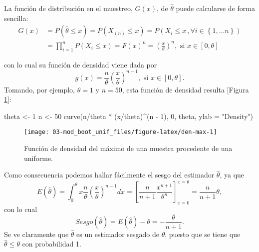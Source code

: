 \documentclass[
]{book}
\newenvironment{Shaded}{\begin{snugshade}}{\end{snugshade}}
\newcommand{\AttributeTok}[1]{\textcolor[rgb]{0.77,0.63,0.00}{#1}}
\newcommand{\DecValTok}[1]{\textcolor[rgb]{0.00,0.00,0.81}{#1}}
\newcommand{\FunctionTok}[1]{\textcolor[rgb]{0.00,0.00,0.00}{#1}}
\newcommand{\NormalTok}[1]{#1}
\newcommand{\OtherTok}[1]{\textcolor[rgb]{0.56,0.35,0.01}{#1}}
\newcommand{\SpecialCharTok}[1]{\textcolor[rgb]{0.00,0.00,0.00}{#1}}
\newcommand{\StringTok}[1]{\textcolor[rgb]{0.31,0.60,0.02}{#1}}
\theoremstyle{break}
\theoremstyle{definition}
\theoremstyle{definition}
\theoremstyle{definition}
\theoremstyle{definition}
\theoremstyle{remark}
\begin{document}
La función de distribución en el muestreo, \(G\left( x \right)\), de
\(\hat{\theta}\) puede calcularse de forma sencilla:\[\begin{aligned}
G\left( x \right) &= P\left( \hat{\theta}\leq x \right) =P\left( X_{\left(
n \right)}\leq x \right) =P\left( X_i\leq x\,,\forall i\in \left\{ 1,\ldots
n\right\} \right) \\
&= \prod_{i=1}^{n}P\left( X_i\leq x \right) =F\left( x \right)^{n}=\left( 
\frac{x}{\theta } \right)^{n},\text{ si }x\in \left[ 0,\theta \right]\end{aligned}\]

con lo cual su función de densidad viene dada por
\[g\left( x \right) =\frac{n}{\theta }\left( \frac{x}{\theta } \right)^{n-1},
\text{ si }x\in \left[ 0,\theta \right] .\]
Tomando, por ejemplo, \(\theta =1\) y \(n=50\), esta función de densidad resulta
{[}Figura \ref{fig:den-max}{]}:

\begin{Shaded}
\begin{Highlighting}[]
\NormalTok{theta }\OtherTok{\textless{}{-}} \DecValTok{1}
\NormalTok{n }\OtherTok{\textless{}{-}} \DecValTok{50}
\FunctionTok{curve}\NormalTok{(n}\SpecialCharTok{/}\NormalTok{theta }\SpecialCharTok{*}\NormalTok{ (x}\SpecialCharTok{/}\NormalTok{theta)}\SpecialCharTok{\^{}}\NormalTok{(n }\SpecialCharTok{{-}} \DecValTok{1}\NormalTok{), }\DecValTok{0}\NormalTok{, theta, }\AttributeTok{ylab =} \StringTok{"Density"}\NormalTok{)}
\end{Highlighting}
\end{Shaded}

\begin{figure}[!htb]

{\centering \texttt{[image: 03-mod\_boot\_unif\_files/figure-latex/den-max-1]} 

}

\caption{Función de densidad del máximo de una muestra procedente de una uniforme.}\label{fig:den-max}
\end{figure}

Como consecuencia podemos hallar fácilmente el sesgo del estimador
\(\hat{\theta}\), ya que
\[E\left( \hat{\theta} \right) =\int_{0}^{\theta }x\frac{n}{\theta }\left( 
\frac{x}{\theta } \right)^{n-1}dx=\left[ \frac{n}{n+1}\frac{x^{n+1}}{\theta
^{n}}\right] _{x=0}^{x=\theta }=\frac{n}{n+1}\theta ,\]
con lo cual
\[Sesgo\left( \hat{\theta} \right) =E\left( \hat{\theta} \right)
-\theta = -\frac{\theta }{n+1}.\]
Se ve claramente que \(\hat{\theta}\)
es un estimador sesgado de \(\theta\), puesto que se tiene que
\(\hat{\theta}\leq \theta\) con probabilidad 1.
\end{document}
